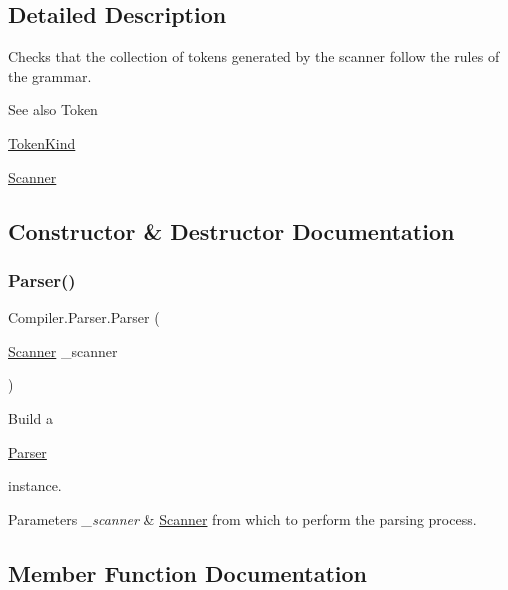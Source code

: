 \subsection{Detailed Description}
Checks that the collection of tokens generated by the scanner follow the rules of the grammar. \begin{DoxySeeAlso}{See also}
Token 

\mbox{\hyperlink{namespace_compiler_a57929962f25004759596fc3f13cf563c}{Token\+Kind}} 

\mbox{\hyperlink{class_compiler_1_1_scanner}{Scanner}} 
\end{DoxySeeAlso}


\subsection{Constructor \& Destructor Documentation}
\mbox{\label{class_compiler_1_1_parser_a450e11452db3f91ff866fc1e36ebc79d}} 
\subsubsection{\texorpdfstring{Parser()}{Parser()}}
{\footnotesize\ttfamily Compiler.\+Parser.\+Parser (\begin{DoxyParamCaption}\item[{\mbox{\hyperlink{class_compiler_1_1_scanner}{Scanner}}}]{\+\_\+scanner }\end{DoxyParamCaption})}

Build a
\begin{DoxyCode}
\mbox{\hyperlink{class_compiler_1_1_parser_a450e11452db3f91ff866fc1e36ebc79d}{Parser}} 
\end{DoxyCode}
 instance. 
\begin{DoxyParams}{Parameters}
{\em \+\_\+scanner} & \mbox{\hyperlink{class_compiler_1_1_scanner}{Scanner}} from which to perform the parsing process. \\
\hline
\end{DoxyParams}


\subsection{Member Function Documentation}
\mbox{\label{class_compiler_1_1_parser_a092fb9fb971023a089eb7505d2223610}} 
